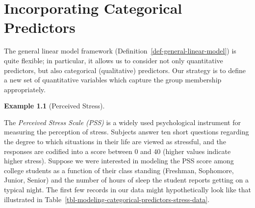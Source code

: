 \documentclass[
  letterpaper,
  DIV=11,
  numbers=noendperiod]{scrreprt}
\theoremstyle{definition}
\theoremstyle{definition}
\newtheorem{example}{Example}[chapter]
\theoremstyle{remark}
\begin{document}
\hypertarget{sec-modeling-categorical-predictors}{%
\chapter{Incorporating Categorical
Predictors}\label{sec-modeling-categorical-predictors}}

\providecommand{\norm}[1]{\left\lVert#1\right\rVert}
\providecommand{\abs}[1]{\left\lvert#1\right\rvert}
\providecommand{\dist}[1]{\stackrel{\text{#1}}{\sim}}
\providecommand{\ind}[1]{\mathbb{I}\left(#1\right)}
\providecommand{\bm}[1]{\mathbf{#1}}
\providecommand{\bs}[1]{\boldsymbol{#1}}
\providecommand{\Ell}{\mathcal{L}}
\providecommand{\indep}{\perp\negthickspace\negmedspace\perp}

The general linear model framework
(Definition~\ref{def-general-linear-model}) is quite flexible; in
particular, it allows us to consider not only quantitative predictors,
but also categorical (qualitative) predictors. Our strategy is to define
a new set of quantitative variables which capture the group membership
appropriately.

\begin{example}[Perceived
Stress]\protect\hypertarget{exm-perceived-stress}{}\label{exm-perceived-stress}

The \emph{Perceived Stress Scale (PSS)} is a widely used psychological
instrument for measuring the perception of stress. Subjects answer ten
short questions regarding the degree to which situations in their life
are viewed as stressful, and the responses are codified into a score
between 0 and 40 (higher values indicate higher stress). Suppose we were
interested in modeling the PSS score among college students as a
function of their class standing (Freshman, Sophomore, Junior, Senior)
and the number of hours of sleep the student reports getting on a
typical night. The first few records in our data might hypothetically
look like that illustrated in
Table~\ref{tbl-modeling-categorical-predictors-stress-data}.

\end{example}
\end{document}
